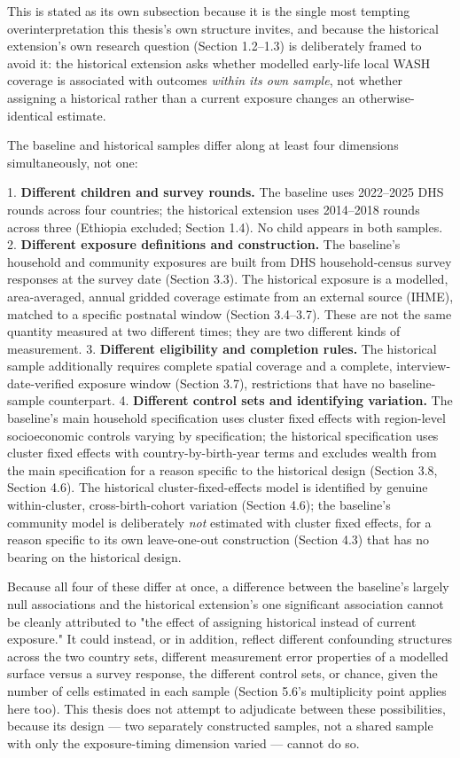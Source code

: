 This is stated as its own subsection because it is the single most tempting overinterpretation this thesis's own structure invites, and because the historical extension's own research question (Section 1.2--1.3) is deliberately framed to avoid it: the historical extension asks whether modelled early-life local WASH coverage is associated with outcomes \textit{within its own sample}, not whether assigning a historical rather than a current exposure changes an otherwise-identical estimate.

The baseline and historical samples differ along at least four dimensions simultaneously, not one:

1. \textbf{Different children and survey rounds.} The baseline uses 2022--2025 DHS rounds across four countries; the historical extension uses 2014--2018 rounds across three (Ethiopia excluded; Section 1.4). No child appears in both samples.
2. \textbf{Different exposure definitions and construction.} The baseline's household and community exposures are built from DHS household-census survey responses at the survey date (Section 3.3). The historical exposure is a modelled, area-averaged, annual gridded coverage estimate from an external source (IHME), matched to a specific postnatal window (Section 3.4--3.7). These are not the same quantity measured at two different times; they are two different kinds of measurement.
3. \textbf{Different eligibility and completion rules.} The historical sample additionally requires complete spatial coverage and a complete, interview-date-verified exposure window (Section 3.7), restrictions that have no baseline-sample counterpart.
4. \textbf{Different control sets and identifying variation.} The baseline's main household specification uses cluster fixed effects with region-level socioeconomic controls varying by specification; the historical specification uses cluster fixed effects with country-by-birth-year terms and excludes wealth from the main specification for a reason specific to the historical design (Section 3.8, Section 4.6). The historical cluster-fixed-effects model is identified by genuine within-cluster, cross-birth-cohort variation (Section 4.6); the baseline's community model is deliberately \textit{not} estimated with cluster fixed effects, for a reason specific to its own leave-one-out construction (Section 4.3) that has no bearing on the historical design.

Because all four of these differ at once, a difference between the baseline's largely null associations and the historical extension's one significant association cannot be cleanly attributed to "the effect of assigning historical instead of current exposure." It could instead, or in addition, reflect different confounding structures across the two country sets, different measurement error properties of a modelled surface versus a survey response, the different control sets, or chance, given the number of cells estimated in each sample (Section 5.6's multiplicity point applies here too). This thesis does not attempt to adjudicate between these possibilities, because its design --- two separately constructed samples, not a shared sample with only the exposure-timing dimension varied --- cannot do so.

